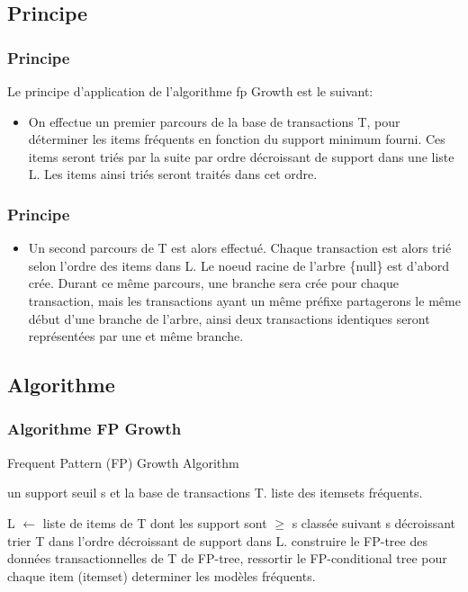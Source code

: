 \documentclass{beamer}
\begin{document}
\subsection[Principe]{Principe}
\frame
{
  \frametitle{Principe}
Le principe d'application de l'algorithme \acrfull{fp}  Growth est le suivant: 
  \begin{itemize}
  \item<1-> On effectue un premier parcours de la base de transactions T, pour déterminer les items fréquents en fonction du support minimum fourni. Ces items seront triés par la suite par ordre décroissant de support dans une liste L. Les items ainsi triés seront traités dans cet ordre.\cite{USDB}
  \end{itemize}
  }
\frame
{
  \frametitle{Principe}
  \begin{itemize}
  \item<1-> Un second parcours de T est alors effectué. Chaque transaction est alors trié selon l'ordre des items dans L. Le noeud racine de l'arbre \{null\} est d'abord crée. Durant ce même parcours, une branche sera crée pour chaque transaction, mais les transactions ayant un même préfixe partagerons le même début d'une branche de l'arbre, ainsi deux transactions identiques seront représentées par une et même branche.\cite{USDB} 
  \end{itemize}
}
\subsection[Algorithme]{Algorithme}
\begin{frame}
  \frametitle{Algorithme FP Growth}

\begin{algorithm}[H]
\caption{Frequent Pattern (FP) Growth Algorithm}
\begin{algorithmic}[1]
\REQUIRE un support seuil s et la base  de transactions T.
\ENSURE  liste des itemsets fréquents.

\STATE L $\gets$ liste de items de T dont les support sont $\geq$ s classée suivant s décroissant
\STATE trier T dans l'ordre décroissant de support dans L.
\STATE construire le FP-tree des données transactionnelles de T
\STATE de FP-tree, ressortir le FP-conditional tree pour chaque item (itemset)
\STATE determiner les modèles fréquents.

\end{algorithmic}
\end{algorithm}
\end{frame}
\end{document}
